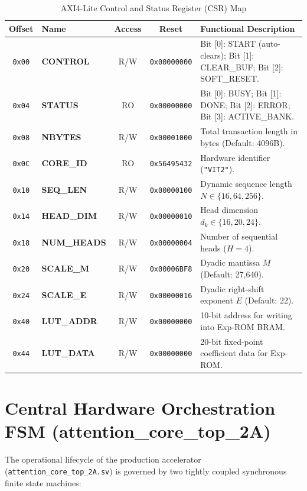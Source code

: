 \begin{table}[htbp]
    \centering
    \small
    \caption{AXI4-Lite Control and Status Register (CSR) Map}
    \label{tab:csr_map}
    \begin{tabularx}{\textwidth}{c l c c X}
        \toprule
        \textbf{Offset} & \textbf{Name} & \textbf{Access} & \textbf{Reset} & \textbf{Functional Description} \\
        \midrule
        \texttt{0x00} & \textbf{CONTROL} & R/W & \texttt{0x00000000} & Bit [0]: START (auto-clears); Bit [1]: CLEAR\_BUF; Bit [2]: SOFT\_RESET. \\
        \texttt{0x04} & \textbf{STATUS}  & RO  & \texttt{0x00000000} & Bit [0]: BUSY; Bit [1]: DONE; Bit [2]: ERROR; Bit [3]: ACTIVE\_BANK. \\
        \texttt{0x08} & \textbf{NBYTES}  & R/W & \texttt{0x00001000} & Total transaction length in bytes (Default: 4096B). \\
        \texttt{0x0C} & \textbf{CORE\_ID} & RO  & \texttt{0x56495432} & Hardware identifier (\texttt{"VIT2"}). \\
        \texttt{0x10} & \textbf{SEQ\_LEN} & R/W & \texttt{0x00000100} & Dynamic sequence length $N \in \{16, 64, 256\}$. \\
        \texttt{0x14} & \textbf{HEAD\_DIM}& R/W & \texttt{0x00000010} & Head dimension $d_k \in \{16, 20, 24\}$. \\
        \texttt{0x18} & \textbf{NUM\_HEADS}& R/W& \texttt{0x00000004} & Number of sequential heads ($H=4$). \\
        \texttt{0x20} & \textbf{SCALE\_M} & R/W & \texttt{0x00006BF8} & Dyadic mantissa $M$ (Default: 27,640). \\
        \texttt{0x24} & \textbf{SCALE\_E} & R/W & \texttt{0x00000016} & Dyadic right-shift exponent $E$ (Default: 22). \\
        \texttt{0x40} & \textbf{LUT\_ADDR}& R/W & \texttt{0x00000000} & 10-bit address for writing into Exp-ROM BRAM. \\
        \texttt{0x44} & \textbf{LUT\_DATA}& R/W & \texttt{0x00000000} & 20-bit fixed-point coefficient data for Exp-ROM. \\
        \bottomrule
    \end{tabularx}
\end{table}

\section{Central Hardware Orchestration FSM (attention\_core\_top\_2A)}
The operational lifecycle of the production accelerator (\texttt{attention\_core\_top\_2A.sv}) is governed by two tightly coupled synchronous finite state machines:

